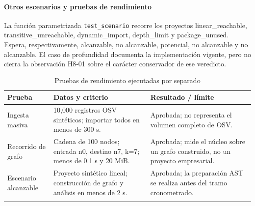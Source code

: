 \paragraph*{Otros escenarios y pruebas de rendimiento}
La función parametrizada \texttt{test\_\allowbreak scenario} recorre los proyectos linear\_reachable, transitive\_unreachable, dynamic\_import, depth\_limit y package\_unused. Espera, respectivamente, alcanzable, no alcanzable, potencial, no alcanzable y no alcanzable. El caso de profundidad documenta la implementación vigente, pero no cierra la observación H8-01 sobre el carácter conservador de ese veredicto.
\begin{table}[H]
\centering\small{}
\caption{Pruebas de rendimiento ejecutadas por separado}
\begin{tabularx}{\textwidth}{P{3cm}YY}
\toprule
\textbf{Prueba} & \textbf{Datos y criterio} & \textbf{Resultado / límite} \\
\midrule
Ingesta masiva & 10,000 registros OSV sintéticos; importar todos en menos de 300 s. & Aprobada; no representa el volumen completo de OSV. \\
\addlinespace
Recorrido de grafo & Cadena de 100 nodos; entrada n0, destino n7, k=7; menos de 0.1 s y 20 MiB. & Aprobada; mide el núcleo sobre un grafo construido, no un proyecto empresarial. \\
\addlinespace
Escenario alcanzable & Proyecto sintético lineal; construcción de grafo y análisis en menos de 2 s. & Aprobada; la preparación AST se realiza antes del tramo cronometrado. \\
\addlinespace
\bottomrule
\end{tabularx}
\end{table}
